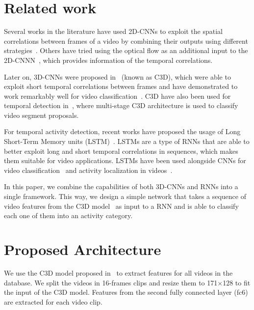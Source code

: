 \documentclass{article}
\begin{document}
\section{Related work}


Several works in the literature have used 2D-CNNs to exploit the spatial correlations between frames of a video by combining their outputs using different strategies~\cite{gkioxari2015contextual,yeung2015end,ballas2015delving}. Others have tried using the optical flow as an additional input to the 2D-CNNN~\cite{wang2015towards}, which provides information of the temporal correlations. %

Later on, 3D-CNNs were proposed in~\cite{tran2014learning} (known as C3D), which were able to exploit short temporal correlations between frames and have demonstrated to work remarkably well for video classification~\cite{tran2014learning,tran2015deep}. C3D have also been used for temporal detection in~\cite{scnn_shou_wang_chang_cvpr16}, where multi-stage C3D architecture is used to classify video segment proposals.

For temporal activity detection, recent works have proposed the usage of Long Short-Term Memory units (LSTM)~\cite{hochreiter1997long}.
LSTMs are a type of RNNs that are able to better exploit long and short temporal correlations in sequences, which makes them suitable for video applications.
LSTMs have been used alongside CNNs for video classification~\cite{yao2015describing} and activity localization in videos~\cite{yeung2015every}.

In this paper, we combine the capabilities of both 3D-CNNs and RNNs into a single framework. This way, we design a simple network that takes a sequence of video features from the C3D model~\cite{tran2014learning} as input to a RNN and is able to classify each one of them into an activity category.


\section{Proposed Architecture}



We use the C3D model proposed in~\cite{tran2014learning} to extract features for all videos in the database. We split the videos in 16-frames clips and resize them to 171$\times$128 to fit the input of the C3D model. Features from the second fully connected layer (fc6) are extracted for each video clip.
\end{document}
